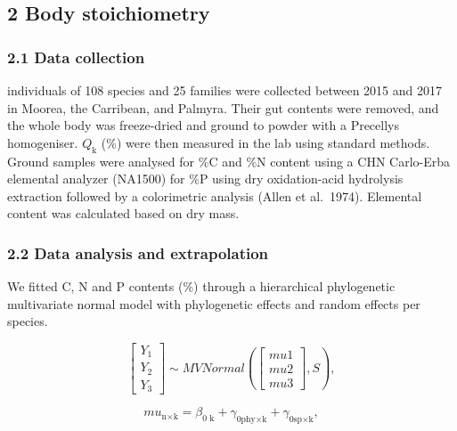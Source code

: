 \documentclass[12pt,a4paper]{article}
\begin{document}
\hypertarget{body-stoichiometry}{%
\subsection{2 Body stoichiometry}\label{body-stoichiometry}}

\hypertarget{data-collection}{%
\subsubsection{2.1 Data collection}\label{data-collection}}

 individuals of 108 species and 25 families were collected
between 2015 and 2017 in Moorea, the Carribean, and Palmyra. Their gut
contents were removed, and the whole body was freeze-dried and ground to
powder with a Precellys homogeniser. \(Q_\textrm{k}\) (\%) were then
measured in the lab using standard methods. Ground samples were analysed
for \%C and \%N content using a CHN Carlo-Erba elemental analyzer
(NA1500) for \%P using dry oxidation-acid hydrolysis extraction followed
by a colorimetric analysis (Allen et al.~1974). Elemental content was
calculated based on dry mass.

\hypertarget{data-analysis-and-extrapolation-1}{%
\subsubsection{2.2 Data analysis and
extrapolation}\label{data-analysis-and-extrapolation-1}}

\noindent We fitted C, N and P contents (\%) through a hierarchical
phylogenetic multivariate normal model with phylogenetic effects and
random effects per species.

\begin{equation}
    \begin{bmatrix}Y_1 \\ Y_2 \\ Y_3\end{bmatrix} \sim MVNormal(\begin{bmatrix}mu1 \\ mu2 \\ mu3\end{bmatrix}, S),
    \label{cnp}
\end{equation}

\begin{equation}
    mu_{\textrm{n}\times\textrm{k}} = \beta_\textrm{0 k} + \gamma_{\textrm{0phy}\times\textrm{k}} + \gamma_{\textrm{0sp}\times\textrm{k}},
    \label{cnp2}
\end{equation}
\end{document}
